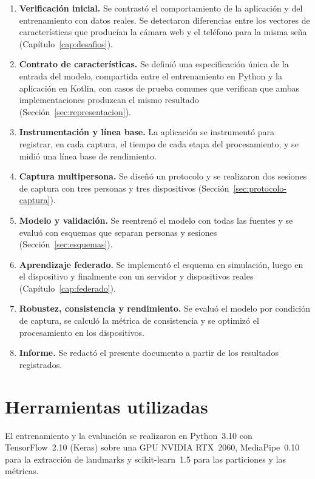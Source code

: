 \begin{enumerate}
    \item \textbf{Verificación inicial.} Se contrastó el comportamiento de la aplicación y del entrenamiento con datos reales. Se detectaron diferencias entre los vectores de características que producían la cámara web y el teléfono para la misma seña (Capítulo~\ref{cap:desafios}).
    \item \textbf{Contrato de características.} Se definió una especificación única de la entrada del modelo, compartida entre el entrenamiento en Python y la aplicación en Kotlin, con casos de prueba comunes que verifican que ambas implementaciones produzcan el mismo resultado (Sección~\ref{sec:representacion}).
    \item \textbf{Instrumentación y línea base.} La aplicación se instrumentó para registrar, en cada captura, el tiempo de cada etapa del procesamiento, y se midió una línea base de rendimiento.
    \item \textbf{Captura multipersona.} Se diseñó un protocolo y se realizaron dos sesiones de captura con tres personas y tres dispositivos (Sección~\ref{sec:protocolo-captura}).
    \item \textbf{Modelo y validación.} Se reentrenó el modelo con todas las fuentes y se evaluó con esquemas que separan personas y sesiones (Sección~\ref{sec:esquemas}).
    \item \textbf{Aprendizaje federado.} Se implementó el esquema en simulación, luego en el dispositivo y finalmente con un servidor y dispositivos reales (Capítulo~\ref{cap:federado}).
    \item \textbf{Robustez, consistencia y rendimiento.} Se evaluó el modelo por condición de captura, se calculó la métrica de consistencia y se optimizó el procesamiento en los dispositivos.
    \item \textbf{Informe.} Se redactó el presente documento a partir de los resultados registrados.
\end{enumerate}

\section{Herramientas utilizadas}

El entrenamiento y la evaluación se realizaron en Python~3.10 con TensorFlow~2.10 (Keras) sobre una GPU NVIDIA RTX~2060, MediaPipe~0.10 para la extracción de landmarks y scikit-learn~1.5 para las particiones y las métricas.

